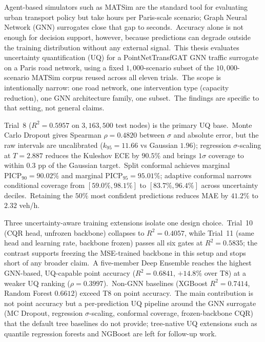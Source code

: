 \chapter{\abstractname}

Agent-based simulators such as MATSim are the standard tool for evaluating urban transport policy but take hours per Paris-scale scenario; Graph Neural Network (GNN) surrogates close that gap to seconds.\ Accuracy alone is not enough for decision support, however, because predictions can degrade outside the training distribution without any external signal.\ This thesis evaluates uncertainty quantification (UQ) for a PointNetTransfGAT GNN traffic surrogate on a Paris road network, using a fixed $1{,}000$-scenario subset of the $10{,}000$-scenario MATSim corpus reused across all eleven trials.\ The scope is intentionally narrow: one road network, one intervention type (capacity reduction), one GNN architecture family, one subset.\ The findings are specific to that setting, not general claims.

Trial~8 ($R^2 = 0.5957$ on $3{,}163{,}500$ test nodes) is the primary UQ base.\ Monte Carlo Dropout gives Spearman $\rho = 0.4820$ between $\sigma$ and absolute error, but the raw intervals are uncalibrated ($k_{95} = 11.66$ vs Gaussian $1.96$); regression $\sigma$-scaling at $T = 2.887$ reduces the Kuleshov ECE by $90.5\%$ and brings $1\sigma$ coverage to within $0.3$ pp of the Gaussian target.\ Split conformal achieves marginal $\mathrm{PICP}_{90} = 90.02\%$ and marginal $\mathrm{PICP}_{95} = 95.01\%$; adaptive conformal narrows conditional coverage from $[59.0\%, 98.1\%]$ to $[83.7\%, 96.4\%]$ across uncertainty deciles.\ Retaining the $50\%$ most confident predictions reduces MAE by $41.2\%$ to $2.32$ veh/h.

Three uncertainty-aware training extensions isolate one design choice.\ Trial~10 (CQR head, unfrozen backbone) collapses to $R^2 = 0.4057$, while Trial~11 (same head and learning rate, backbone frozen) passes all six gates at $R^2 = 0.5835$; the contrast supports freezing the MSE-trained backbone in this setup and stops short of any broader claim.\ A five-member Deep Ensemble reaches the highest GNN-based, UQ-capable point accuracy ($R^2 = 0.6841$, $+14.8\%$ over T8) at a weaker UQ ranking ($\rho = 0.3997$).\ Non-GNN baselines (XGBoost $R^2 = 0.7414$, Random Forest $0.6612$) exceed T8 on point accuracy.\ The main contribution is not point accuracy but a per-prediction UQ pipeline around the GNN surrogate (MC Dropout, regression $\sigma$-scaling, conformal coverage, frozen-backbone CQR) that the default tree baselines do not provide; tree-native UQ extensions such as quantile regression forests and NGBoost are left for follow-up work.
